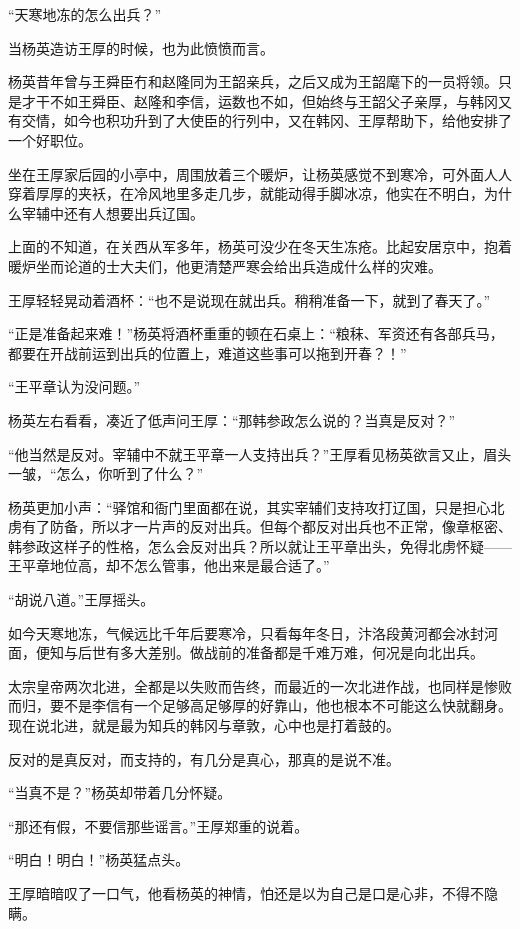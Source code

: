 “天寒地冻的怎么出兵？”

当杨英造访王厚的时候，也为此愤愤而言。

杨英昔年曾与王舜臣冇和赵隆同为王韶亲兵，之后又成为王韶麾下的一员将领。只是才干不如王舜臣、赵隆和李信，运数也不如，但始终与王韶父子亲厚，与韩冈又有交情，如今也积功升到了大使臣的行列中，又在韩冈、王厚帮助下，给他安排了一个好职位。

坐在王厚家后园的小亭中，周围放着三个暖炉，让杨英感觉不到寒冷，可外面人人穿着厚厚的夹袄，在冷风地里多走几步，就能动得手脚冰凉，他实在不明白，为什么宰辅中还有人想要出兵辽国。

上面的不知道，在关西从军多年，杨英可没少在冬天生冻疮。比起安居京中，抱着暖炉坐而论道的士大夫们，他更清楚严寒会给出兵造成什么样的灾难。

王厚轻轻晃动着酒杯：“也不是说现在就出兵。稍稍准备一下，就到了春天了。”

“正是准备起来难！”杨英将酒杯重重的顿在石桌上：“粮秣、军资还有各部兵马，都要在开战前运到出兵的位置上，难道这些事可以拖到开春？！”

“王平章认为没问题。”

杨英左右看看，凑近了低声问王厚：“那韩参政怎么说的？当真是反对？”

“他当然是反对。宰辅中不就王平章一人支持出兵？”王厚看见杨英欲言又止，眉头一皱，“怎么，你听到了什么？”

杨英更加小声：“驿馆和衙门里面都在说，其实宰辅们支持攻打辽国，只是担心北虏有了防备，所以才一片声的反对出兵。但每个都反对出兵也不正常，像章枢密、韩参政这样子的性格，怎么会反对出兵？所以就让王平章出头，免得北虏怀疑——王平章地位高，却不怎么管事，他出来是最合适了。”

“胡说八道。”王厚摇头。

如今天寒地冻，气候远比千年后要寒冷，只看每年冬日，汴洛段黄河都会冰封河面，便知与后世有多大差别。做战前的准备都是千难万难，何况是向北出兵。

太宗皇帝两次北进，全都是以失败而告终，而最近的一次北进作战，也同样是惨败而归，要不是李信有一个足够高足够厚的好靠山，他也根本不可能这么快就翻身。现在说北进，就是最为知兵的韩冈与章敦，心中也是打着鼓的。

反对的是真反对，而支持的，有几分是真心，那真的是说不准。

“当真不是？”杨英却带着几分怀疑。

“那还有假，不要信那些谣言。”王厚郑重的说着。

“明白！明白！”杨英猛点头。

王厚暗暗叹了一口气，他看杨英的神情，怕还是以为自己是口是心非，不得不隐瞒。

